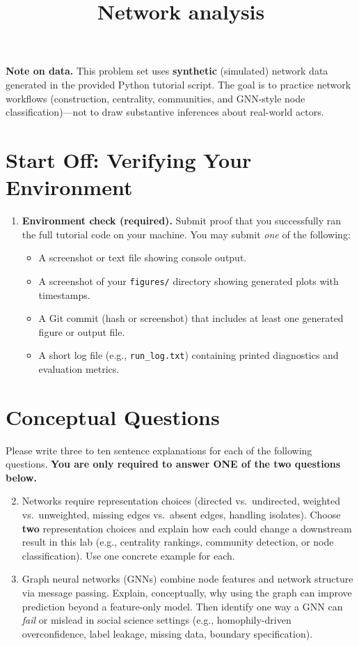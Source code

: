 \documentclass[11pt]{article}
\title{ Network analysis}
\author{ }
\date{ }
\begin{document}
\maketitle

\noindent \textbf{Note on data.} This problem set uses \textbf{synthetic} (simulated) network data generated in the provided Python tutorial script. The goal is to practice network workflows (construction, centrality, communities, and GNN-style node classification)---not to draw substantive inferences about real-world actors.

\section*{Start Off: Verifying Your Environment}

\begin{enumerate}
\item \textbf{Environment check (required).}  
Submit proof that you successfully ran the full tutorial code on your machine. You may submit \emph{one} of the following:
\begin{itemize}
  \item A screenshot or text file showing console output.
  \item A screenshot of your \texttt{figures/} directory showing generated plots with timestamps.
  \item A Git commit (hash or screenshot) that includes at least one generated figure or output file.
  \item A short log file (e.g., \texttt{run\_log.txt}) containing printed diagnostics and evaluation metrics.
\end{itemize}
\end{enumerate}

\section*{Conceptual Questions}
Please write three to ten sentence explanations for each of the following questions. \textbf{You are only required to answer ONE of the two questions below.} \bigskip
 
\begin{enumerate}
\setcounter{enumi}{1}

\item Networks require representation choices (directed vs.\ undirected, weighted vs.\ unweighted, missing edges vs.\ absent edges, handling isolates). Choose \textbf{two} representation choices and explain how each could change a downstream result in this lab (e.g., centrality rankings, community detection, or node classification). Use one concrete example for each.

\item Graph neural networks (GNNs) combine node features and network structure via message passing. Explain, conceptually, why using the graph can improve prediction beyond a feature-only model. Then identify one way a GNN can \emph{fail} or mislead in social science settings (e.g., homophily-driven overconfidence, label leakage, missing data, boundary specification).

  \end{enumerate}
\end{document}
